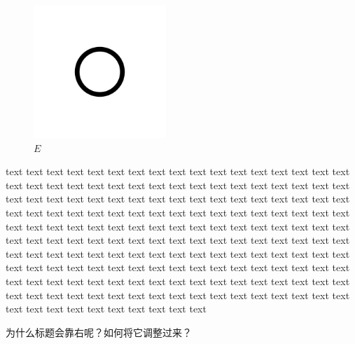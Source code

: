 \documentclass{amsart}
\begin{document}
\begin{figure}
	\includegraphics[width=5cm]{figures/figure1.png}
	\caption{$E$}
\end{figure}	
text text text text text text text text text text text text text text text text text text text text text text text text text text text text text text text text text text text text text text text text text text text text text text text text text text text text text text text text text text text text text text text text text text text text text text text text text text text text text text text text text text text text text text text text text text text text text text text text text text text text text text text text text text text text text text text text text text text text text text text text text text text text text text text text text text text text text text text text text text text text text text text text text text text text text text text text text text text text text text text text text text text text text text text text text text text text text text text text text text text text 

为什么标题会靠右呢？如何将它调整过来？
\end{document}
